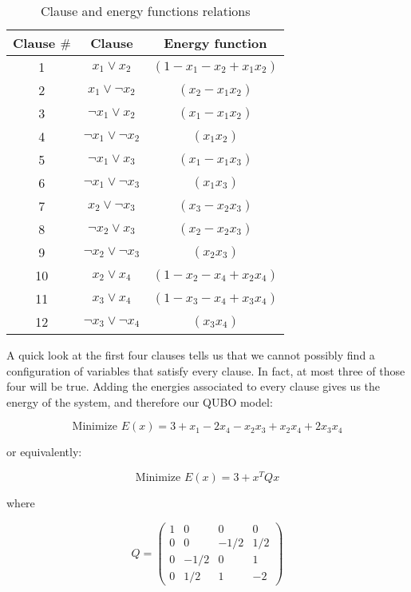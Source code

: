 \begin{table}[h]
	\centering
	\begin{tabular}{ccc}
		Clause $\#$	& Clause						& Energy function				\\  		\hline
		1       	& $x_1 \vee x_2$    			& $(1 - x_1 - x_2 + x_1x_2)$	\\
		2       	& $x_1 \vee \neg x_2$    		& $(x_2 - x_1x_2)$				\\
		3       	& $\neg x_1 \vee x_2$    		& $(x_1 - x_1x_2)$				\\
		4       	& $\neg x_1 \vee \neg x_2$    	& $(x_1x_2)$					\\
		5       	& $\neg x_1 \vee x_3$    		& $(x_1 - x_1x_3)$				\\
		6		  	& $\neg x_1 \vee \neg x_3$    	& $(x_1x_3)$					\\
		7       	& $x_2 \vee \neg x_3$    		& $(x_3 - x_2x_3)$				\\
		8       	& $\neg x_2 \vee x_3$    		& $(x_2 - x_2x_3)$				\\
		9       	& $\neg x_2 \vee \neg x_3$    	& $(x_2x_3)$					\\
		10       	& $x_2 \vee x_4$    			& $(1 - x_2 - x_4 + x_2x_4)$	\\
		11       	& $x_3 \vee x_4$    			& $(1 - x_3 - x_4 + x_3x_4)$	\\
		12       	& $\neg x_3 \vee \neg x_4$    	& $(x_3x_4)$					
	\end{tabular}
	\caption{Clause and energy functions relations}
	\label{tab:penalties-max-2-sat-example}
\end{table}

A quick look at the first four clauses tells us that we cannot possibly find a configuration of variables that satisfy every clause. In fact, at most three of those four will be true. Adding the energies associated to every clause gives us the energy of the system, and therefore our QUBO model:

$$ \text{Minimize } E(x) = 3 + x_1 - 2 x_4 - x_2x_3 + x_2x_4 + 2 x_3x_4 $$

or equivalently:

$$ \text{Minimize } E(x) = 3 + x^T Q x $$

where

$$
Q = 
\left(
\begin{array}{cccc}
1 & 0 & 0 & 0 \\
0 & 0 & -1/2 & 1/2 \\
0 & -1/2 & 0 & 1 \\
0 & 1/2 & 1 & -2 
\end{array}
\right)
$$


